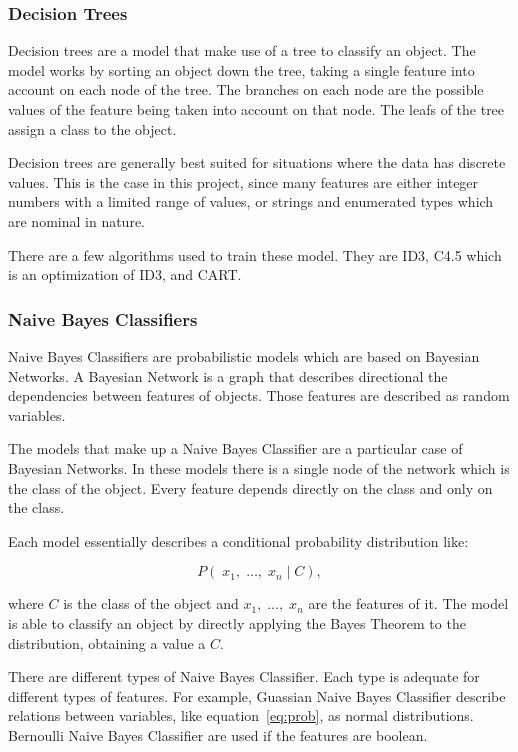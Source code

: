 \subsubsection{Decision Trees}

Decision trees are a model that make use of a tree to classify an object. The
model works by sorting an object down the tree, taking a single feature into
account on each node of the tree. The branches on each node are the possible
values of the feature being taken into account on that node. The leafs of the
tree assign a class to the object.

Decision trees are generally best suited for situations where the data has
discrete values. This is the case in this project, since many features are
either integer numbers with a limited range of values, or strings and
enumerated types which are nominal in nature.

There are a few algorithms used to train these model. They are ID3, C4.5 which
is an optimization of ID3, and CART.~\cite{book_ml,book_dm_practical}

\subsubsection{Naive Bayes Classifiers}

Naive Bayes Classifiers are probabilistic models which are based on Bayesian
Networks. A Bayesian Network is a graph that describes directional the
dependencies between features of objects. Those features are described as
random variables.

The models that make up a Naive Bayes Classifier are a particular case of
Bayesian Networks. In these models there is a single node of the network which
is the class of the object. Every feature depends directly on the class and
only on the class.

Each model essentially describes a conditional probability distribution like:

\begin{equation} \label{eq:prob} P(\; x_1, \; \dots, \; x_n \; | \; C),
\end{equation}

where $ C $ is the class of the object and $ x_1, \; \dots, \; x_n $ are the
features of it. The model is able to classify an object by directly applying
the Bayes Theorem to the distribution, obtaining a value a $ C $.

There are different types of Naive Bayes Classifier. Each type is adequate for
different types of features. For example, Guassian Naive Bayes Classifier
describe relations between variables, like equation~\ref{eq:prob}, as normal
distributions. Bernoulli Naive Bayes Classifier are used if the features are
boolean.


